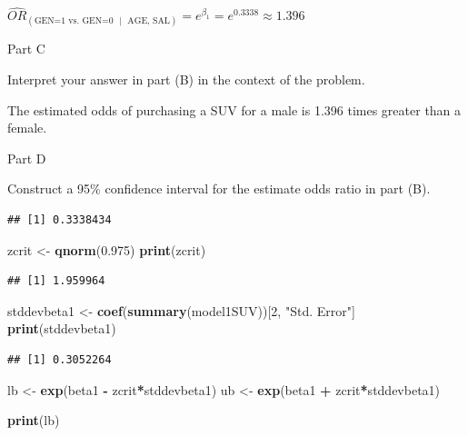 \documentclass[
]{article}
\newenvironment{Shaded}{\begin{snugshade}}{\end{snugshade}}
\newcommand{\DecValTok}[1]{\textcolor[rgb]{0.00,0.00,0.81}{#1}}
\newcommand{\FloatTok}[1]{\textcolor[rgb]{0.00,0.00,0.81}{#1}}
\newcommand{\FunctionTok}[1]{\textcolor[rgb]{0.13,0.29,0.53}{\textbf{#1}}}
\newcommand{\NormalTok}[1]{#1}
\newcommand{\OtherTok}[1]{\textcolor[rgb]{0.56,0.35,0.01}{#1}}
\newcommand{\SpecialCharTok}[1]{\textcolor[rgb]{0.81,0.36,0.00}{\textbf{#1}}}
\newcommand{\StringTok}[1]{\textcolor[rgb]{0.31,0.60,0.02}{#1}}
\begin{document}
\({{\widehat{OR}}_{\left( \text{GEN=1 vs}\text{. GEN=0   }\text{  | } \text{ AGE, SAL} \right)}}={{e}^{{{\beta }_{1}}}}={{e}^{0.3338}}\approx 1.396\)

Part C

Interpret your answer in part (B) in the context of the problem.

The estimated odds of purchasing a SUV for a male is 1.396 times greater
than a female.

Part D

Construct a 95\% confidence interval for the estimate odds ratio in part
(B).

\begin{Shaded}
\end{Shaded}

\begin{verbatim}
## [1] 0.3338434
\end{verbatim}

\begin{Shaded}
\begin{Highlighting}[]
\NormalTok{zcrit }\OtherTok{\textless{}{-}} \FunctionTok{qnorm}\NormalTok{(}\FloatTok{0.975}\NormalTok{)}
\FunctionTok{print}\NormalTok{(zcrit)}
\end{Highlighting}
\end{Shaded}

\begin{verbatim}
## [1] 1.959964
\end{verbatim}

\begin{Shaded}
\begin{Highlighting}[]
\NormalTok{stddevbeta1 }\OtherTok{\textless{}{-}} \FunctionTok{coef}\NormalTok{(}\FunctionTok{summary}\NormalTok{(model1SUV))[}\DecValTok{2}\NormalTok{, }\StringTok{"Std. Error"}\NormalTok{]}
\FunctionTok{print}\NormalTok{(stddevbeta1)}
\end{Highlighting}
\end{Shaded}

\begin{verbatim}
## [1] 0.3052264
\end{verbatim}

\begin{Shaded}
\begin{Highlighting}[]
\NormalTok{lb }\OtherTok{\textless{}{-}} \FunctionTok{exp}\NormalTok{(beta1 }\SpecialCharTok{{-}}\NormalTok{ zcrit}\SpecialCharTok{*}\NormalTok{stddevbeta1)}
\NormalTok{ub }\OtherTok{\textless{}{-}} \FunctionTok{exp}\NormalTok{(beta1 }\SpecialCharTok{+}\NormalTok{ zcrit}\SpecialCharTok{*}\NormalTok{stddevbeta1)}

\FunctionTok{print}\NormalTok{(lb)}
\end{Highlighting}
\end{Shaded}
\end{document}
